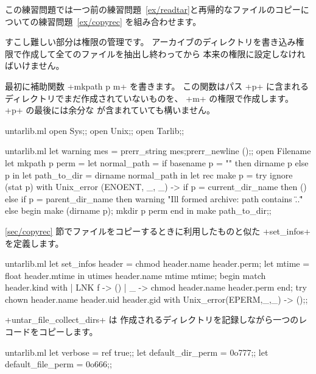 \begin{answer}
この練習問題では一つ前の練習問題~\ref {ex/readtar}と再帰的なファイルのコピーについての練習問題~\ref {ex/copyrec} を組み合わせます。


すこし難しい部分は権限の管理です。
アーカイブのディレクトリを書き込み権限で作成して全てのファイルを抽出し終わってから
本来の権限に設定しなければいけません。

最初に補助関数 \ml+mkpath p m+ を書きます。
この関数はパス \ml+p+ に含まれるディレクトリでまだ作成されていないものを、 \ml+m+ の権限で作成します。
\ml+p+ の最後には余分な \quotes{\ml+/+} が含まれていても構いません。
%
\begin{codefile}{untarlib.ml}
open Sys;;
open Unix;;
open Tarlib;;
\end{codefile}
%
\begin{listingcodefile}{untarlib.ml}
let warning mes = prerr_string mes;prerr_newline ();;
open Filename
let mkpath p perm =
  let normal_path =
    if basename p = "" then dirname p else p in
  let path_to_dir = dirname normal_path in
  let rec make p =
    try ignore (stat p)
    with Unix_error (ENOENT, _, _) ->
      if p = current_dir_name then ()
      else if p = parent_dir_name then
        warning "Ill formed archive: path contains \"..\""
      else begin
        make (dirname p);
        mkdir p perm
      end in
  make path_to_dir;;
\end{listingcodefile}
%
\ref {sec/copyrec} 節でファイルをコピーするときに利用したものと似た
\ml+set_infos+ を定義します。
%
\begin{listingcodefile}{untarlib.ml}
let set_infos header =
  chmod header.name header.perm;
  let mtime = float header.mtime in
  utimes header.name mtime mtime;
  begin match header.kind with
  | LNK f -> ()
  | _ ->  chmod header.name header.perm
  end;
  try chown header.name  header.uid header.gid
  with Unix_error(EPERM,_,_) -> ();;
\end{listingcodefile}
%
\ml+untar_file_collect_dirs+ は
作成されるディレクトリを記録しながら一つのレコードをコピーします。
%
\begin{listingcodefile}{untarlib.ml}
let verbose = ref true;;
let default_dir_perm = 0o777;;
let default_file_perm = 0o666;;


\end{listingcodefile}
\end{answer}
